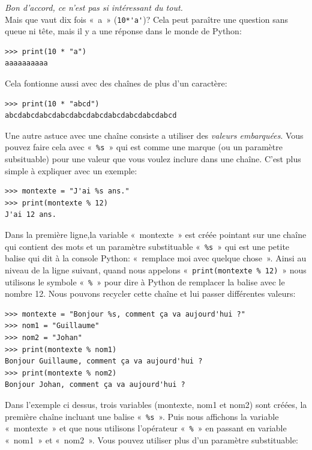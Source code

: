   \emph{Bon d'accord, ce n'est pas si intéressant du tout.}\\

Mais que vaut dix fois «~a~» (\verb+10*'a'+)? Cela peut paraître une question sans queue ni tête, mais il y a une réponse dans le monde de Python:

\begin{Verbatim}[frame=single,rulecolor=\color{mbleu}, label=à taper]
>>> print(10 * "a")
aaaaaaaaaa
\end{Verbatim}
Cela fontionne aussi avec des chaînes de plus d'un caractère:

\begin{Verbatim}[frame=single,rulecolor=\color{mbleu}, label=à taper]
>>> print(10 * "abcd")
abcdabcdabcdabcdabcdabcdabcdabcdabcdabcd
\end{Verbatim}

Une autre astuce avec une chaîne consiste a utiliser des \emph{valeurs embarquées}.\index{\%} 
Vous pouvez faire cela avec «~\texttt{\%s}~» qui est comme une marque (ou un paramètre subsituable) pour une valeur que vous voulez inclure dans une chaîne. C'est plus simple à expliquer avec un exemple: 

\begin{Verbatim}[frame=single,rulecolor=\color{mbleu}, label=à taper]
>>> montexte = "J'ai %s ans."
>>> print(montexte % 12)
J'ai 12 ans.
\end{Verbatim}

Dans la première ligne,la variable «~montexte~» est créée pointant sur une chaîne qui contient des mots et un paramètre substituable «~\texttt{\%s}~» qui est une petite balise qui dit à la console Python: «~remplace moi avec quelque chose~». Ainsi au niveau de la ligne suivant, quand nous appelons «~\texttt{print(montexte \% 12)}~» nous utilisons le symbole «~\texttt{\%}~» pour dire à Python de remplacer la balise avec le nombre 12.
Nous pouvons recycler cette chaîne et lui passer différentes valeurs:

\begin{Verbatim}[frame=single,rulecolor=\color{mbleu}, label=à taper]
>>> montexte = "Bonjour %s, comment ça va aujourd'hui ?"
>>> nom1 = "Guillaume"
>>> nom2 = "Johan"
>>> print(montexte % nom1)
Bonjour Guillaume, comment ça va aujourd'hui ?
>>> print(montexte % nom2)
Bonjour Johan, comment ça va aujourd'hui ?
\end{Verbatim}

Dans l'exemple ci dessus, trois variables (montexte, nom1 et nom2) sont créées, la première chaîne incluant une balise «~\texttt{\%s}~». Puis nous affichons la variable «~montexte~» et que nous utilisons l'opérateur «~\texttt{\%}~»  en passant en variable «~nom1~» et «~nom2~». Vous pouvez utiliser plus d'un paramètre substituable:

